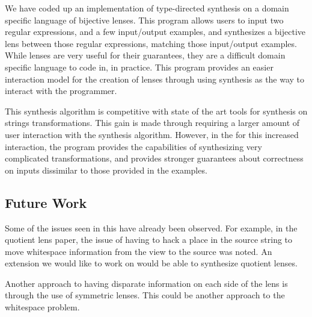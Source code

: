 \documentclass[numbers]{sigplanconf}
\begin{document}
We have coded up an implementation of type-directed synthesis on a domain
specific language of bijective lenses.  This program allows users to input two
regular expressions, and a few input/output examples, and synthesizes a
bijective lens between those regular expressions, matching those input/output
examples.  While lenses are very useful for their guarantees, they are a
difficult domain specific language to code in, in practice.  This program
provides an easier interaction model for the creation of lenses through using
synthesis as the way to interact with the programmer.

This synthesis algorithm is competitive with state of the art tools for
synthesis on strings transformations.  This gain is made through requiring a
larger amount of user interaction with the synthesis algorithm.  However, in the
for this increased interaction, the program provides the capabilities of
synthesizing very complicated transformations, and provides stronger guarantees
about correctness on inputs dissimilar to those provided in the examples.

\subsection{Future Work}
Some of the issues seen in this have already been observed.  For example, in the
quotient lens paper, the issue of having to hack a place in the source string to
move whitespace information from the view to the source was noted.  An extension
we would like to work on would be able to synthesize quotient lenses.

Another approach to having disparate information on each side of the lens is
through the use of symmetric lenses.  This could be another approach to the
whitespace problem.


\appendix

\ifanon\else
\acks 
\fi







\end{document}
